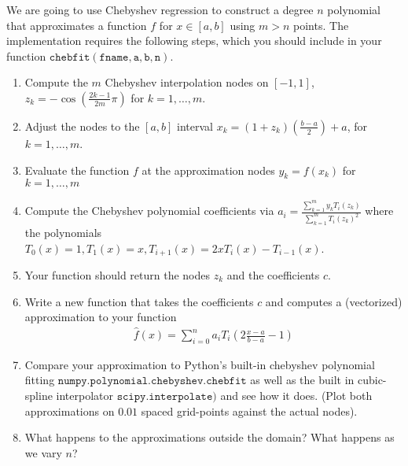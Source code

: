 \documentclass{article}
\begin{document}
We are going to use Chebyshev regression to construct a degree $n$ polynomial that approximates a function $f$ for $x \in [a,b]$ using $m > n $ points. The implementation requires the following steps, which you should include in your function $\mathtt{chebfit(fname,a,b,n)}$.
\begin{enumerate}
\item Compute the $m$ Chebyshev interpolation nodes on $[-1,1]$, $z_k = - \cos\left(\frac{2k-1}{2m} \pi \right)$ for $k=1,\ldots, m$.
\item Adjust the nodes to the $[a,b]$ interval $x_k = (1+z_k) \left(\frac{b-a}{2} \right) + a$, for $k=1,\ldots,m$.
\item Evaluate the function $f$ at the approximation nodes $y_k = f(x_k)$  for $k=1,\ldots,m$
\item Compute the Chebyshev polynomial coefficients via $a_i = \frac{\sum_{k=1}^m y_k T_i(z_k)}{\sum_{k=1}^m  T_i(z_k)^2}$ where the polynomials\\ $T_0(x) = 1, T_1(x) = x, T_{i+1}(x) = 2xT_i(x) - T_{i-1}(x)$. 
\item Your function should return the nodes $z_k$ and the coefficients $c$.
\item Write a new function that takes the coefficients $c$ and computes a (vectorized) approximation to your function
\begin{eqnarray*}
\hat{f}(x) = \sum_{i=0}^n a_i T_i \left( 2 \frac{x-a}{b-a} -1 \right)
\end{eqnarray*}
\item Compare your approximation to Python's built-in chebyshev polynomial fitting $\mathtt{numpy.polynomial.chebyshev.chebfit}$ as well as the built in cubic-spline interpolator $\mathtt{scipy.interpolate)}$ and see how it does. (Plot both approximations on $0.01$ spaced grid-points against the actual nodes).
\item What happens to the approximations outside the domain? What happens as we vary $n$?

\end{enumerate}
\end{document}
